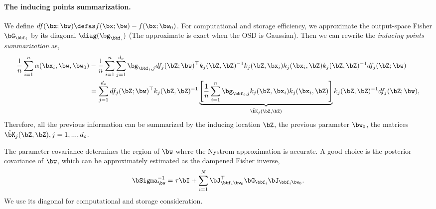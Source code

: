 \paragraph{The inducing points summarization.} We define $df(\bx; \bw ) \defas f(\bx; \bw) - f(\bx; \bw_0)$. For computational and storage efficiency, we approximate the output-space Fisher $\bG_{\bbf_i}$ by its diagonal $\diag(\bg_{\bbf_i})$ (The approximate is exact when the OSD is Gaussian). Then we can rewrite the \emph{inducing points summarization} as,
\begin{align}
    \frac{1}{n}\sum_{i=1}^n  \alpha(\bx_i, \bw, \bw_0) 
    & - \frac{1}{n}\sum_{i=1}^n \sum_{j=1}^{d_o} \bg_{\bbf_i, j} df_j(\bZ; \bw )^{\top} k_j(\bZ, \bZ)^{-1}  k_j(\bZ, \bx_i)k_j(\bx_i, \bZ) k_j(\bZ, \bZ)^{-1} df_j(\bZ; \bw ) \notag \\
    &=\sum_{j=1}^{d_o}  df_j(\bZ; \bw )^{\top} k_j(\bZ, \bZ)^{-1} \underbrace{\left[\frac{1}{n}\sum_{i=1}^n \bg_{\bbf_i, j}k_j(\bZ, \bx_i)k_j(\bx_i, \bZ)  \right]}_{\hat{\bK}_j(\bZ, \bZ) } k_j(\bZ, \bZ)^{-1} df_j(\bZ; \bw ), \notag 
\end{align}
Therefore, all the previous information can be summarized by the inducing location $\bZ$, the previous parameter $\bw_0$, the matrices $\hat{\bK}_j(\bZ, \bZ), j=1,...,d_o$. 


The parameter covariance determines the region of $\bw$ where the Nystrom approximation is accurate. A good choice is the posterior covariance of $\bw$, which can be approximately estimated as the dampened Fisher inverse,
\begin{align}
    \bSigma_{\bw}^{-1} = \tau \bI + \sum_{i=1}^N\bJ_{\bbf_i \bw_0}^{\top} \bG_{\bbf_i} \bJ_{\bbf_i \bw_0}.
\end{align}
We use its diagonal for computational and storage consideration.

